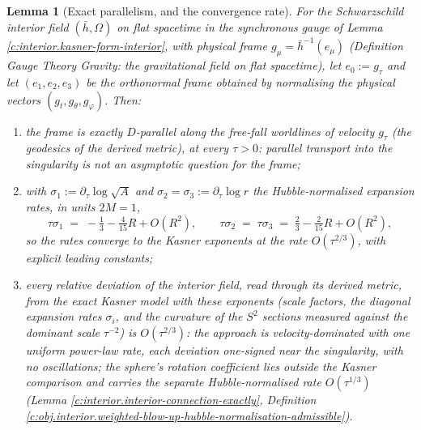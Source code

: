 \documentclass[11pt]{article}
\newtheorem{lemma}[theorem]{Lemma}
\theoremstyle{definition}
\theoremstyle{plain}
\newcommand{\changedmark}[2]{\marginpar{\raggedright\scriptsize\color{#1}#2}}
\providecommand{\hb}{}\renewcommand{\hb}{\bar{h}}
\begin{document}
\begin{lemma}[Exact parallelism, and the convergence rate]\label{c:interior.exact-parallelism-convergence-rate}
\changedmark{gray}{reworded}
For the Schwarzschild interior field $(\hb, \Omega)$ on flat spacetime in the synchronous gauge of Lemma \ref{c:interior.kasner-form-interior}, with physical frame $g_\mu = \hb^{-1}(e_\mu)$ (Definition \emph{Gauge Theory Gravity: the gravitational field on flat spacetime}), let $e_0 := g_\tau$ and let $(e_1, e_2, e_3)$ be the orthonormal frame obtained by normalising the physical vectors $(g_t, g_\theta, g_\varphi)$. Then:
\begin{enumerate}
\item the frame is \emph{exactly} $D$-parallel along the free-fall worldlines of velocity $g_\tau$ (the geodesics of the derived metric), at every $\tau > 0$: parallel transport into the singularity is not an asymptotic question for the frame;
\item with $\sigma_1 := \partial_\tau \log \sqrt{A}$ and $\sigma_2 = \sigma_3 := \partial_\tau \log r$ the Hubble-normalised expansion rates, in units $2M = 1$,
\[
\tau\sigma_1 \;=\; -\tfrac13 - \tfrac{4}{15}R + O(R^2),
\qquad
\tau\sigma_2 \;=\; \tau\sigma_3 \;=\; \tfrac23 - \tfrac{2}{15}R + O(R^2),
\]
so the rates converge to the Kasner exponents at the rate $O(\tau^{2/3})$, with explicit leading constants;
\item every relative deviation of the interior field, read through its derived metric, from the exact Kasner model with these exponents (scale factors, the diagonal expansion rates $\sigma_i$, and the curvature of the $S^2$ sections measured against the dominant scale $\tau^{-2}$) is $O(\tau^{2/3})$: the approach is velocity-dominated with one uniform power-law rate, each deviation one-signed near the singularity, with no oscillations; the sphere's rotation coefficient lies outside the Kasner comparison and carries the separate Hubble-normalised rate $O(\tau^{1/3})$ (Lemma \ref{c:interior.interior-connection-exactly}, Definition \ref{c:obj.interior.weighted-blow-up-hubble-normalisation-admissible}).
\end{enumerate}
\end{lemma}
\end{document}
